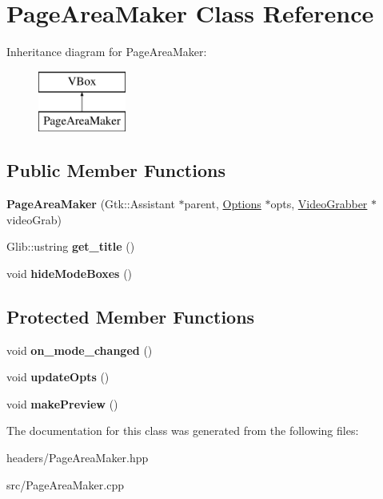 \hypertarget{classPageAreaMaker}{\section{Page\-Area\-Maker Class Reference}
\label{classPageAreaMaker}
}
Inheritance diagram for Page\-Area\-Maker\-:\begin{figure}[H]
\begin{center}
\leavevmode
\includegraphics[height=2.000000cm]{classPageAreaMaker}
\end{center}
\end{figure}
\subsection*{Public Member Functions}
\begin{DoxyCompactItemize}
\item 
\hypertarget{classPageAreaMaker_a34cc8b3883e08accf0a0f7545ed2db1f}{{\bfseries Page\-Area\-Maker} (Gtk\-::\-Assistant $\ast$parent, \hyperlink{structOptions}{Options} $\ast$opts, \hyperlink{classVideoGrabber}{Video\-Grabber} $\ast$video\-Grab)}\label{classPageAreaMaker_a34cc8b3883e08accf0a0f7545ed2db1f}

\item 
\hypertarget{classPageAreaMaker_abace3043eafde9e50c13a26e8b27b2d6}{Glib\-::ustring {\bfseries get\-\_\-title} ()}\label{classPageAreaMaker_abace3043eafde9e50c13a26e8b27b2d6}

\item 
\hypertarget{classPageAreaMaker_a72aa63471d73a79e4ce94c939b06cc99}{void {\bfseries hide\-Mode\-Boxes} ()}\label{classPageAreaMaker_a72aa63471d73a79e4ce94c939b06cc99}

\end{DoxyCompactItemize}
\subsection*{Protected Member Functions}
\begin{DoxyCompactItemize}
\item 
\hypertarget{classPageAreaMaker_af30ee07c1b3627c94f0a429b6723773a}{void {\bfseries on\-\_\-mode\-\_\-changed} ()}\label{classPageAreaMaker_af30ee07c1b3627c94f0a429b6723773a}

\item 
\hypertarget{classPageAreaMaker_a8a5e4e1bd2f7cd889d5d475a04d7bb63}{void {\bfseries update\-Opts} ()}\label{classPageAreaMaker_a8a5e4e1bd2f7cd889d5d475a04d7bb63}

\item 
\hypertarget{classPageAreaMaker_a63eba0d0aff4ad489cfc6d9231614c1a}{void {\bfseries make\-Preview} ()}\label{classPageAreaMaker_a63eba0d0aff4ad489cfc6d9231614c1a}

\end{DoxyCompactItemize}


The documentation for this class was generated from the following files\-:\begin{DoxyCompactItemize}
\item 
headers/Page\-Area\-Maker.\-hpp\item 
src/Page\-Area\-Maker.\-cpp\end{DoxyCompactItemize}
